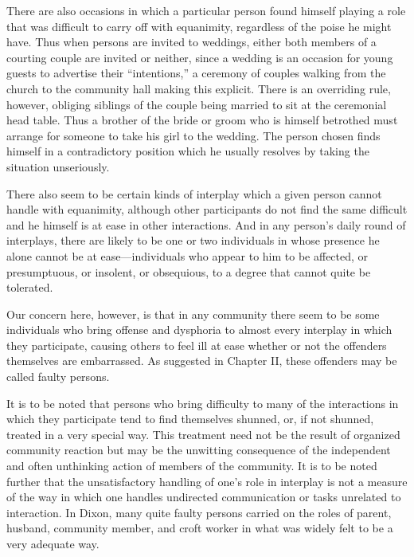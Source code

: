 \documentclass[twoside,symmetric,nobib,justified]{tufte-book}
\begin{document}
There are also occasions in which a particular person found himself
playing a role that was difficult to carry off with equanimity,
regardless of the poise he might have. Thus when persons are invited to
weddings, either both members of a courting couple are invited or
neither, since a wedding is an occasion for young guests to advertise
their ``intentions,'' a ceremony of couples walking from the church to
the community hall making this explicit. There is an overriding rule,
however, obliging siblings of the couple being married to sit at the
ceremonial head table. Thus a brother of the bride or groom who is
himself betrothed must arrange for someone to take his girl to the
wedding. The person chosen finds himself in a contradictory position
which he usually resolves by taking the situation unseriously.

There also seem to be certain kinds of interplay which a given person
cannot handle with equanimity, although other participants do not find
the same difficult and he himself is at ease in other interactions. And
in any person's daily round of interplays, there are likely to be one or
two individuals in whose presence he alone cannot be at
ease---individuals who appear to him to be affected, or presumptuous, or
insolent, or obsequious, to a degree that cannot quite be tolerated.

Our concern here, however, is that in any community there seem to be
some individuals who bring offense and dysphoria to almost every
interplay in which they participate, causing others to feel ill at ease
whether or not the offenders themselves are embarrassed. As suggested in
Chapter II, these offenders may be called faulty persons.

It is to be noted that persons who bring difficulty to many of the
interactions in which they participate tend to find themselves shunned,
or, if not shunned, treated in a very special way. This treatment need
not be the result of organized community reaction but may be the
unwitting consequence of the independent and often unthinking action of
members of the community. It is to be noted further that the
unsatisfactory handling of one's role in interplay is not a measure of
the way in which one handles undirected communication or tasks unrelated
to interaction. In Dixon, many quite faulty persons carried on the roles
of parent, husband, community member, and croft worker in what was
widely felt to be a very adequate way.
\end{document}
